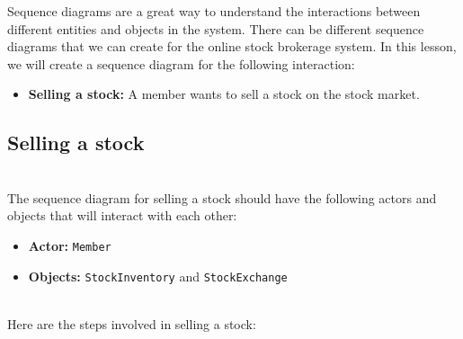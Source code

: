 

Sequence diagrams are a great way to understand the interactions between different entities and objects in the system. There can be different sequence diagrams that we can create for the online stock brokerage system. In this lesson, we will create a sequence diagram for the following interaction:

\begin{itemize}
\item
\protect{}\label{a5GVHvv4Yf1v7S4jThwHv}
\textbf{Selling a stock:} A member wants to sell a stock on the stock market.
\end{itemize}

\subsection{Selling a stock}\label{NrvxzbzrTLW780nvMOYhS}
\\
The sequence diagram for selling a stock should have the following actors and objects that will interact with each other:

\begin{itemize}
\item
\protect{}\label{pzx30-soaTbACX08EbOWv}
\textbf{Actor:} \texttt{Member}
\item
\protect{}\label{tM_VCLH2hi7q6mjG2T8Lu}
\textbf{Objects:} \texttt{StockInventory} and \texttt{StockExchange}
\end{itemize}
\\
Here are the steps involved in selling a stock:

